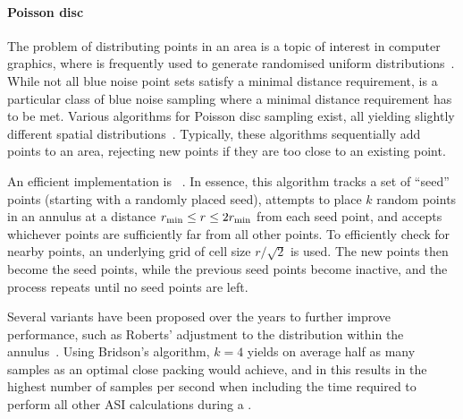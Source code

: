 \paragraph{Poisson disc}
The problem of distributing points in an area is a topic of interest in computer graphics, where  is frequently used to generate randomised uniform distributions~\cite{BlueNoiseSurvey}. %
While not all blue noise point sets satisfy a minimal distance requirement,  is a particular class of blue noise sampling where a minimal distance requirement has to be met.
Various algorithms for Poisson disc sampling exist, all yielding slightly different spatial distributions~\cite{EfficientBlueNoisePointSets,PoissonDiskComparison,SamplingPolyominoes}.
Typically, these algorithms sequentially add points to an area, rejecting new points if they are too close to an existing point. \\\par

An efficient implementation is ~\cite{FastPoissonDiskSampling}.
In essence, this algorithm tracks a set of ``seed'' points (starting with a randomly placed seed), attempts to place $k$ random points in an annulus at a distance $r_\mathrm{min} \leq r \leq 2 r_\mathrm{min}$ from each seed point, and accepts whichever points are sufficiently far from all other points.
To efficiently check for nearby points, an underlying grid of cell size $r/\sqrt{2}$ is used.
The new points then become the seed points, while the previous seed points become inactive, and the process repeats until no seed points are left. \par
Several variants have been proposed over the years to further improve performance, such as Roberts' adjustment to the distribution within the annulus~\cite{PoissonRoberts}.
Using Bridson's algorithm, $k=4$ yields on average half as many samples as an optimal close packing would achieve, and in \hotspice this results in the highest number of samples per second when including the time required to perform all other ASI calculations during a . \\\par

